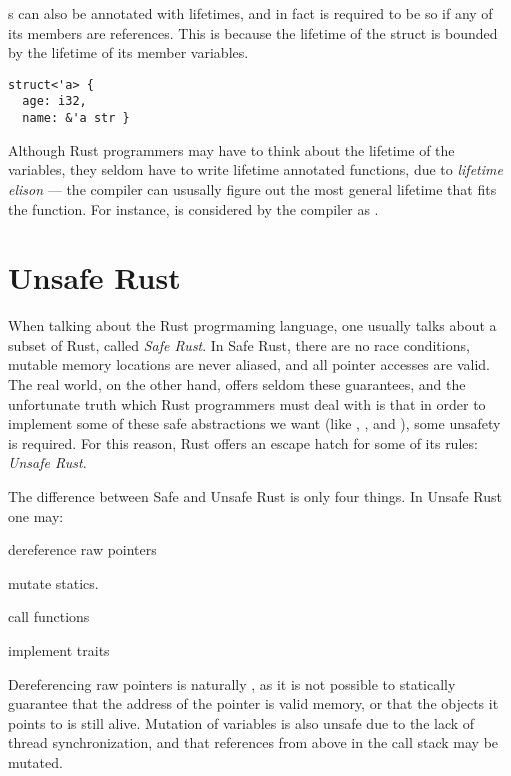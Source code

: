 s can also be annotated with lifetimes, and in fact is required to be so if any of its
members are references. This is because the lifetime of the struct is bounded by the lifetime of
its member variables.
\begin{lstlisting}
struct<'a> {
  age: i32,
  name: &'a str }
\end{lstlisting}

Although Rust programmers may have to think about the lifetime of the variables, they seldom have
to write lifetime annotated functions, due to \emph{lifetime elison} --- the compiler can ususally
figure out the most general lifetime that fits the function. For instance,  is considered by the compiler as .




\section{Unsafe Rust}

When talking about the Rust progrmaming language, one usually talks about a subset of Rust, called
\emph{Safe Rust}. In Safe Rust, there are no race conditions, mutable memory locations are never
aliased, and all pointer accesses are valid.  The real world, on the other hand, offers seldom
these guarantees, and the unfortunate truth which Rust programmers must deal with is that in order
to implement some of these safe abstractions we want (like , , and
), some unsafety is required.  For this reason, Rust offers an escape hatch for some of
its rules: \emph{Unsafe Rust}.

The difference between Safe and Unsafe Rust is only four things. In Unsafe Rust one may:
\begin{enumerate*}[1) ]
    \item dereference raw pointers
    \item mutate statics.
    \item call  functions
    \item implement  traits
\end{enumerate*}

Dereferencing raw pointers is naturally , as it is not possible to statically
guarantee that the address of the pointer is valid memory, or that the objects it points to is
still alive. Mutation of   variables is also unsafe due to the lack of thread
synchronization, and that  references from above in the call stack may be mutated.

